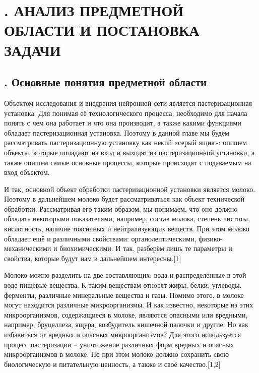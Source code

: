 \setcounter{chaptercntr}{1}

\sectionbreak \section*{
  \gostTitleFont
  \redline
  \thechaptercntr .
  АНАЛИЗ ПРЕДМЕТНОЙ ОБЛАСТИ И ПОСТАНОВКА ЗАДАЧИ
}

\titlespace

\subsection*{
  \gostTitleFont
  \redline
  \thechaptercntr .\thesubchaptercntr \spc
  Основные понятия предметной области
} \addtocounter{subchaptercntr}{1}

\subtitlespace

{\gostFont

  \par \redline Объектом исследования и внедрения нейронной сети является пастеризационная установка. Для понимая её технологического процесса, необходимо для начала понять с чем она работает и что она производит, а также какими функциями обладает пастеризационная установка. Поэтому в данной главе мы будем рассматривать пастеризационную установку как некий «серый ящик»: опишем объекты, которые попадают на вход и выходят из пастеризационной установки, а также опишем самые основные процессы, которые происходят с подаваемым на вход объектом.

  \par \redline И так, основной объект обработки пастеризационной установки является молоко. Поэтому в дальнейшем молоко будет рассматриваться как объект технической обработки. Рассматривая его таким образом, мы понимаем, что оно должно обладать некоторыми показателями, например, состав молока, степень чистоты, кислотность, наличие токсичных и нейтрализующих веществ. При этом молоко обладает ещё и различными свойствами: органолептическими, физико-механическими и биохимическими. И так, разберём лишь те параметры и свойства, которые будут нам в дальнейшем интересны.[1]

  \par \redline Молоко можно разделить на две составляющих: вода и распределённые в этой воде пищевые вещества. К таким веществам относят жиры, белки, углеводы, ферменты, различные минеральные вещества и газы. Помимо этого, в молоке могут находится различные микроорганизмы. И как известно, некоторые из этих микроорганизмов, содержащиеся в молоке, являются опасными или вредными, например, бруцеллеза, ящура, возбудитель кишечной палочки и другие. Но как избавиться от вредных и опасных микроорганизмов?  Для этого используется процесс пастеризации {--} уничтожение различных форм вредных и опасных микроорганизмов в молоке. Но при этом молоко должно сохранить свою биологическую и питательную ценность, а также и своё качество.[1,2]

}

